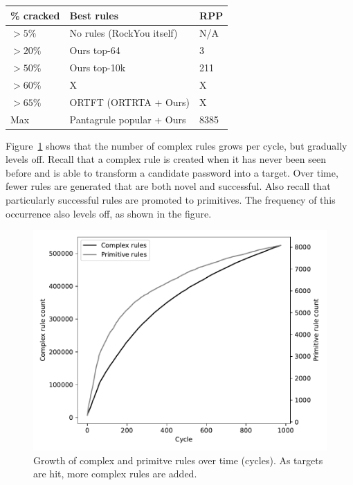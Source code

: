 \documentclass[letterpaper,twocolumn,10pt]{article}
\begin{document}
\begin{table}
\centering
\begin{tabular}{|l|l|l|}
    \hline
    \% cracked & Best rules & RPP \\
    \hline
    $>5\%$ & No rules (RockYou itself) & N/A \\
    $>20\%$ & Ours top-64 & 3 \\
    $>50\%$ & Ours top-10k & 211 \\
    $>60\%$ & X & X \\
    $>65\%$ & ORTFT (ORTRTA + Ours) & X \\
    Max & Pantagrule popular + Ours & 8385 \\
    \hline
\end{tabular}
\end{table}

Figure~\ref{fig:rule-count} shows that the number of complex rules grows per
cycle, but gradually levels off. Recall that a complex rule is created when it
has never been seen before and is able to transform a candidate password into a
target. Over time, fewer rules are generated that are both novel and
successful. Also recall that particularly successful rules are promoted to
primitives. The frequency of this occurrence also levels off, as shown in the
figure.

\begin{figure}[h]
\includegraphics[width=\linewidth]
{analysis/passwords-analysis/stats-rules_composites_size.pdf}
\caption{Growth of complex and primitve rules over time (cycles). As targets
are hit, more complex rules are added. }
\label{fig:rule-count}
\end{figure}
\end{document}
